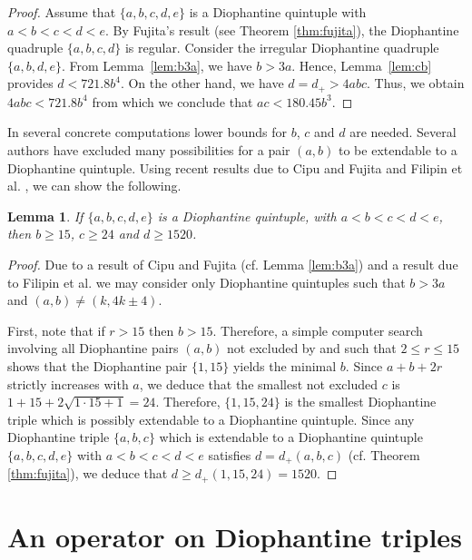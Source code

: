 \documentclass{amsart}
\newtheorem{lemma}{Lemma}
\theoremstyle{definition}
\begin{document}
\begin{proof}
Assume that $\{a, b, c, d, e\}$ is a Diophantine quintuple with $a < b < c < d < e$. By Fujita's result \cite{Fujita-1} (see Theorem \ref{thm:fujita}),
the Diophantine quadruple $\{a, b, c, d\}$ is regular. Consider the irregular Diophantine quadruple $\{a, b, d, e\}$. From Lemma~\ref{lem:b3a}, we have $b>3a$.
Hence, Lemma~\ref{lem:cb} provides $d<721.8b^4$. On the other hand, we have $d=d_{+} >4abc$.
Thus, we obtain $4abc<721.8b^4$ from which we conclude that $ac<180.45 b^3$.  
\end{proof}

In several concrete computations lower bounds for $b$, $c$ and $d$ are needed. Several authors have excluded many possibilities
for a pair $(a, b)$ to be extendable to a Diophantine quintuple. Using recent results due to Cipu and Fujita \cite{Cipu-Fujita} and Filipin et al. \cite{FFT2}, we can show the following.

\begin{lemma}\label{lem:min_bcd}
 If $\{a, b, c, d, e\}$ is a Diophantine quintuple, with $a<b<c<d<e$, then $b\geq 15$, $c\geq 24$ and $d\geq 1520$.
\end{lemma}

\begin{proof}
 Due to a result of Cipu and Fujita \cite{Cipu-Fujita} (cf. Lemma \ref{lem:b3a}) and a result due to Filipin et al. \cite{FFT2} we may consider only Diophantine quintuples
 such that $b>3a$ and $(a,b)\neq (k,4k\pm 4)$.
 
 First, note that if $r>15$ then $b>15$. Therefore, a simple computer search involving all Diophantine pairs $(a, b)$ not excluded by \cite{Cipu-Fujita} and \cite{FFT2} such that $2\leq r \leq 15$ shows that the Diophantine pair $\{1,15\}$ yields the minimal $b$. Since $a+b+2r$ strictly increases with $a$, we deduce that the smallest not excluded $c$ is $1+15+2\sqrt{1\cdot15+1}=24$. Therefore, $\{1,15,24\}$ is the smallest Diophantine triple which is possibly extendable to a Diophantine quintuple. Since any Diophantine triple $\{a, b, c\}$ which is extendable to a Diophantine quintuple $\{a, b, c, d, e\}$ with $a<b<c<d<e$ satisfies $d=d_+(a, b, c)$ (cf. Theorem \ref{thm:fujita}), we deduce that $d\geq d_+(1,15,24)=1520$.
\end{proof}


\section{An operator on Diophantine triples}\label{sec:3}
\end{document}
